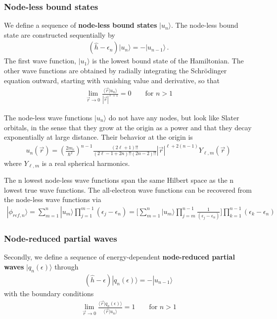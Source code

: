 \documentclass[11pt,a4paper]{report}
\begin{document}
\subsubsection{Node-less bound states}
We define\cite{bloechl12_arxiv1210_5937} a sequence of
\textbf{node-less bound states}
$|u_n\rangle$. The node-less bound state are constructed sequentially
by
\begin{eqnarray}
(\hat{h}-\epsilon_n)|u_n\rangle=-|u_{n-1}\rangle
\,.
\label{eq:nodelesseq}
\end{eqnarray}
The first wave function, $|u_1\rangle$ is the lowest bound state of
the Hamiltonian. The other wave functions are obtained by radially
integrating the Schr\"odinger equation outward, starting with
vanishing value and derivative, so that
\begin{eqnarray}
\lim_{\vec{r}\rightarrow0}\frac{\langle\vec{r}|u_n\rangle}{|\vec{r}|^{\ell+1}}=0
\qquad\text{for $n>1$}
\end{eqnarray}


The node-less wave functions $|u_n\rangle$ do not have any nodes, but
look like Slater orbitals, in the sense that they grow at the origin
as a power and that they decay exponentially at large distance. Their
behavior at the origin is\cite{bloechl12_arxiv1210_5937}
\begin{eqnarray}
u_{n}(\vec{r})
=\left(\frac{2m_e}{\hbar^2}\right)^{n-1}
\frac{(2\ell+1)!!}{(2\ell-1+2n)!!(2n-2)!!}
|\vec{r}|^{\ell+2(n-1)}Y_{\ell,m}(\vec{r})
\end{eqnarray}
where $Y_{\ell,m}$ is a real spherical harmonics.

The n lowest node-less wave functions span the same Hilbert space as
the n lowest true wave functions. The all-electron wave functions can
be recovered from the node-less wave functions
via\cite{bloechl12_arxiv1210_5937}
\begin{eqnarray}
|\phi_{ref,n}\rangle=\sum_{m=1}^n|u_m\rangle \prod_{j=1}^{m-1}(\epsilon_j-\epsilon_n)
=\biggl[\sum_{m=1}^n|u_m\rangle 
\prod_{j=m}^{n-1}\frac{1}{(\epsilon_j-\epsilon_n)}
\biggr]\prod_{k=1}^{n-1}(\epsilon_k-\epsilon_n)
\end{eqnarray}

\subsubsection{Node-reduced partial waves}
Secondly, we define \cite{bloechl12_arxiv1210_5937} a sequence of
energy-dependent \textbf{node-reduced partial waves}
 $|q_n(\epsilon)\rangle$ through
\begin{eqnarray}
(\hat{h}-\epsilon)|q_n(\epsilon)\rangle=-|u_{n-1}\rangle
\label{eq:defnodereducedpartialwave}
\end{eqnarray}
with the boundary conditions
\begin{eqnarray}
\lim_{\vec{r}\rightarrow0}
\frac{\langle\vec{r}|q_n(\epsilon)\rangle}
{\langle\vec{r}|u_n\rangle}=1
\qquad\text{for $n>1$}
\end{eqnarray}
\end{document}
